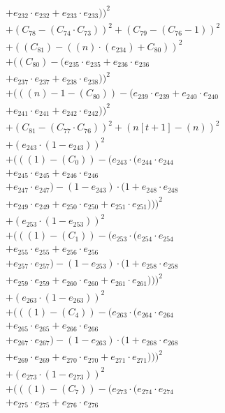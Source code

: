 \documentclass[10pt, a4paper]{article}
\begin{document}
\begin{align*}
& + e_{232} \cdot e_{232} + e_{233} \cdot e_{233}))^{2} \\
& + (C_{78} - (C_{74}  \cdot  C_{73}))^{2} + (C_{79} - (C_{76} - 1))^{2} \\
& + ((C_{81}) - ((n)  \cdot  (e_{234}) + C_{80}))^{2} \\
& + ((C_{80}) - (e_{235} \cdot e_{235} + e_{236} \cdot e_{236} \\
& + e_{237} \cdot e_{237} + e_{238} \cdot e_{238}))^{2} \\
& + (((n) - 1 - (C_{80})) - (e_{239} \cdot e_{239} + e_{240} \cdot e_{240} \\
& + e_{241} \cdot e_{241} + e_{242} \cdot e_{242}))^{2} \\
& + (C_{81} - (C_{77}  \cdot  C_{76}))^{2} + (n[t+1] - (n))^{2} \\
& + (e_{243} \cdot (1 - e_{243}))^{2} \\
& + (((1) - (C_{0})) - (e_{243} \cdot (e_{244} \cdot e_{244} \\
& + e_{245} \cdot e_{245} + e_{246} \cdot e_{246} \\
& + e_{247} \cdot e_{247}) - (1 - e_{243}) \cdot (1 + e_{248} \cdot e_{248} \\
& + e_{249} \cdot e_{249} + e_{250} \cdot e_{250} + e_{251} \cdot e_{251})))^{2} \\
& + (e_{253} \cdot (1 - e_{253}))^{2} \\
& + (((1) - (C_{1})) - (e_{253} \cdot (e_{254} \cdot e_{254} \\
& + e_{255} \cdot e_{255} + e_{256} \cdot e_{256} \\
& + e_{257} \cdot e_{257}) - (1 - e_{253}) \cdot (1 + e_{258} \cdot e_{258} \\
& + e_{259} \cdot e_{259} + e_{260} \cdot e_{260} + e_{261} \cdot e_{261})))^{2} \\
& + (e_{263} \cdot (1 - e_{263}))^{2} \\
& + (((1) - (C_{4})) - (e_{263} \cdot (e_{264} \cdot e_{264} \\
& + e_{265} \cdot e_{265} + e_{266} \cdot e_{266} \\
& + e_{267} \cdot e_{267}) - (1 - e_{263}) \cdot (1 + e_{268} \cdot e_{268} \\
& + e_{269} \cdot e_{269} + e_{270} \cdot e_{270} + e_{271} \cdot e_{271})))^{2} \\
& + (e_{273} \cdot (1 - e_{273}))^{2} \\
& + (((1) - (C_{7})) - (e_{273} \cdot (e_{274} \cdot e_{274} \\
& + e_{275} \cdot e_{275} + e_{276} \cdot e_{276} \\

\end{align*}
\end{document}

